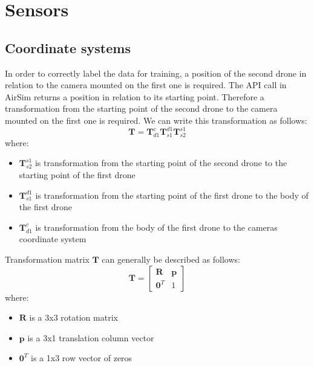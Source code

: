 \documentclass[twoside]{ctuthesis}
\theoremstyle{plain}
\theoremstyle{definition}
\theoremstyle{note}
\begin{document}
\chapter{Sensors}
\section{Coordinate systems}
In order to correctly label the data for training, a position of the second drone in relation to the camera mounted on the first one is required. The API call in AirSim returns a position in relation to its starting point. Therefore a transformation from the starting point of the second drone to the camera mounted on the first one is required. We can write this transformation as follows:
\begin{equation}
	\textbf{T}=\textbf{T}_{d1}^{c}\textbf{T}_{s1}^{d1}\textbf{T}_{s2}^{s1}
\end{equation}
where:
\begin{itemize}
	\item $\textbf{T}_{s2}^{s1}$ is transformation from the starting point of the second drone to the starting point of the first drone
	\item $\textbf{T}_{s1}^{d1}$ is transformation from the starting point of the first drone to the body of the first drone
	\item $\textbf{T}_{d1}^{c}$ is transformation from the body of the first drone to the cameras coordinate system
\end{itemize}
Transformation matrix $\textbf{T}$ can generally be described as follows:
\begin{equation}
	\textbf{T}=\begin{bmatrix}
		\textbf{R} & \textbf{p}\\
		\textbf{0}^T & 1
	\end{bmatrix}
\end{equation}
where:
\begin{itemize}
	\item $\textbf{R}$ is a 3x3 rotation matrix
	\item $\textbf{p}$ is a 3x1 translation column vector
	\item $\textbf{0}^T$ is a 1x3 row vector of zeros
\end{itemize}
\end{document}
